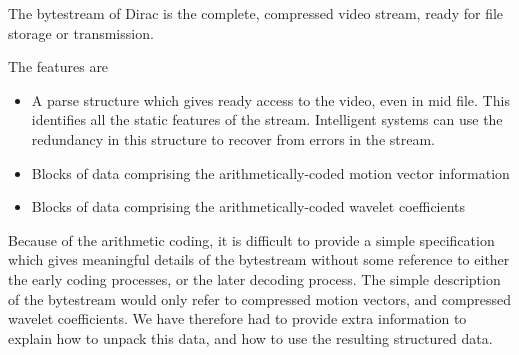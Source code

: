The bytestream of Dirac is the complete, compressed video stream, ready
for file storage or transmission.

The features are

\begin{itemize}
    \item A parse structure which gives ready access to the video, even
    in mid file. This identifies all the static features of the stream.
    Intelligent systems can use the redundancy in this structure to
    recover from errors in the stream.

    \item Blocks of data comprising the arithmetically-coded motion
    vector information

    \item Blocks of data comprising the arithmetically-coded wavelet
    coefficients
\end{itemize}

Because of the arithmetic coding, it is difficult to provide a simple
specification which gives meaningful details of the bytestream without
some reference to either the early coding processes, or the later
decoding process. The simple description of the bytestream would only
refer to compressed motion vectors, and compressed wavelet coefficients.
We have therefore had to provide extra information to explain how to
unpack this data, and how to use the resulting structured data.
